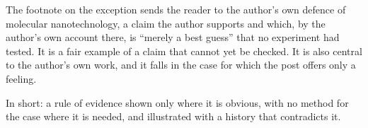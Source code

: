\begin{afterword}
The footnote on the exception sends the reader to the author's own defence of molecular nanotechnology, a claim the author supports and which, by the author's own account there, is ``merely a best guess'' that no experiment had tested. It is a fair example of a claim that cannot yet be checked. It is also central to the author's own work, and it falls in the case for which the post offers only a feeling.

In short: a rule of evidence shown only where it is obvious, with no method for the case where it is needed, and illustrated with a history that contradicts it.
\end{afterword}
